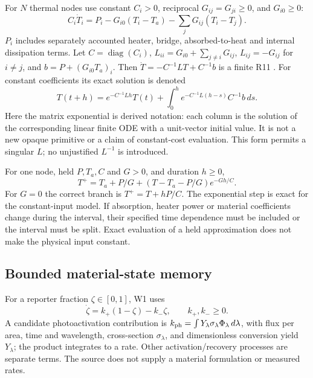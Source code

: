 For $N$ thermal nodes use constant $C_i>0$, reciprocal
$G_{ij}=G_{ji}\ge0$, and $G_{i0}\ge0$:
\begin{equation}
 C_i\dot T_i=P_i-G_{i0}(T_i-T_a)
                    -\sum_jG_{ij}(T_i-T_j).
 \label{eq:want-network}
\end{equation}
$P_i$ includes separately accounted heater, bridge, absorbed-to-heat and
internal dissipation terms. Let $C=\operatorname{diag}(C_i)$,
$L_{ii}=G_{i0}+\sum_{j\ne i}G_{ij}$, $L_{ij}=-G_{ij}$ for $i\ne j$,
and $b=P+(G_{i0}T_a)_i$. Then $\dot T=-C^{-1}LT+C^{-1}b$ is a finite
R11 . For constant coefficients its exact solution is denoted
\begin{equation}
 T(t+h)=e^{-C^{-1}Lh}T(t)
               +\int_0^h e^{-C^{-1}L(h-s)}C^{-1}b\,ds .
\end{equation}
Here the matrix exponential is derived notation: each column is the solution
of the corresponding linear finite ODE with a unit-vector initial value.
It is not a new opaque primitive or a claim of constant-cost evaluation.
This form permits a singular $L$; no unjustified $L^{-1}$ is introduced.

For one node, held $P,T_a,C$ and $G>0$, and duration $h\ge0$,
\begin{equation}
 T^+=T_a+P/G+(T-T_a-P/G)e^{-Gh/C}.
 \label{eq:want-thermal-step}
\end{equation}
For $G=0$ the correct branch is $T^+=T+hP/C$. The exponential step is exact
for the constant-input model. If absorption, heater power or material
coefficients change during the interval, their specified time dependence
must be included or the interval must be split. Exact evaluation of a held
approximation does not make the physical input constant.

\subsection{Bounded material-state memory}
For a reporter fraction $\zeta\in[0,1]$, W1 uses
\begin{equation}
 \dot\zeta=k_+(1-\zeta)-k_-\zeta,\qquad k_+,k_-\ge0 .
\end{equation}
A candidate photoactivation contribution is
$k_{\rm ph}=\int Y_\lambda\sigma_\lambda\Phi_\lambda\,d\lambda$,
with flux per area, time and wavelength, cross-section $\sigma_\lambda$,
and dimensionless conversion yield $Y_\lambda$; the product integrates to a
rate. Other activation/recovery processes are separate terms. The source
does not supply a material formulation or measured rates.

